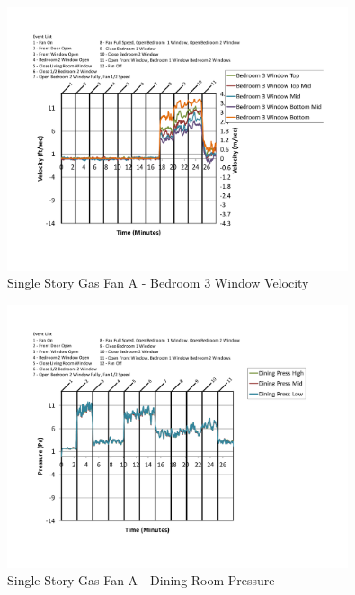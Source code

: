 \documentclass{article}
\begin{document}
\begin{appendices}
	\begin{figure}[H]
		\centering
		\includegraphics[height=3.05in,trim=0.67in 1.1in 0.67in 0.8in,clip=true]{0_Images/Results_Charts/ColdFlow/Single_Story/Gas/A/Bedroom_3_Window_Velocity.pdf}
		\caption{Single Story Gas Fan A - Bedroom 3 Window Velocity}
	\end{figure}
 

	\begin{figure}[H]
		\centering
		\includegraphics[height=3.05in,trim=0.67in 1.1in 0.67in 0.8in,clip=true]{0_Images/Results_Charts/ColdFlow/Single_Story/Gas/A/Dining_Room_Pressure.pdf}
		\caption{Single Story Gas Fan A - Dining Room Pressure}
	\end{figure}
 
	\clearpage


\end{appendices}
\end{document}
